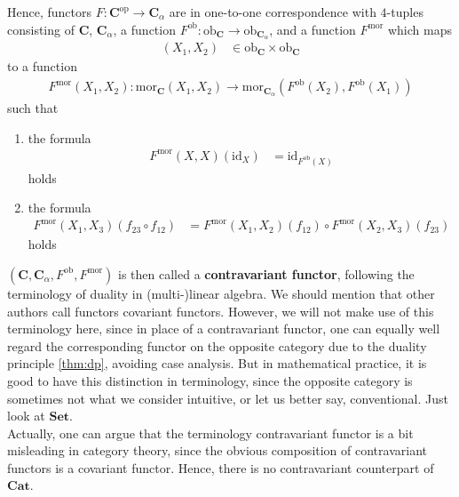 Hence, functors $F \colon \mathbf{C}^{\mathrm{op}} \rightarrow \mathbf{C}_{\alpha}$ are in one-to-one correspondence with $4$-tuples consisting of $\mathbf{C}$, $\mathbf{C}_{\alpha}$, a function $F^{\mathrm{ob}} \colon \mathrm{ob}_{\mathbf{C}} \rightarrow \mathrm{ob}_{\mathbf{C}_{\alpha}}$, and a function $F^{\mathrm{mor}}$ which maps
\begin{align*}
  (X_{1},X_{2})
  &\in
  \mathrm{ob}_{\mathbf{C}}
  \times
  \mathrm{ob}_{\mathbf{C}}
\end{align*}
to a function
\begin{align*}
  F^{\mathrm{mor}}(X_{1},X_{2})
  \colon
  \mathrm{mor}_{\mathbf{C}}(X_{1},X_{2})
  \rightarrow
  \mathrm{mor}_{\mathbf{C}_{\alpha}}
  (F^{\mathrm{ob}}(X_{2}),F^{\mathrm{ob}}(X_{1}))
\end{align*}
such that
\begin{enumerate}
\item[(F1$_{\mathbf{C}}^{\prime}$)]
the formula
\begin{align*}
  F^{\mathrm{mor}}(X,X)(\mathrm{id}_{X})
  &=
  \mathrm{id}_{F^{\mathrm{ob}}(X)}
\end{align*}
holds
\item[(F2$_{\mathbf{C}}^{\prime}$)]
the formula
\begin{align*}
  F^{\mathrm{mor}}(X_{1},X_{3})(f_{23} \circ f_{12})
  &=
  F^{\mathrm{mor}}(X_{1},X_{2})(f_{12})
  \circ
  F^{\mathrm{mor}}(X_{2},X_{3})(f_{23})
\end{align*}  
holds
\end{enumerate}
$(\mathbf{C},\mathbf{C}_{\alpha},F^{\mathrm{ob}},F^{\mathrm{mor}})$ is then called a \textbf{contravariant functor}, following the terminology of duality in (multi-)linear algebra.
We should mention that other authors call functors covariant functors.
However, we will not make use of this terminology here, since in place of a contravariant functor, one can equally well regard the corresponding functor on the opposite category due to the duality principle \ref{thm:dp}, avoiding case analysis.
But in mathematical practice, it is good to have this distinction in terminology, since the opposite category is sometimes not what we consider intuitive, or let us better say, conventional.
Just look at $\mathbf{Set}$.
\\
Actually, one can argue that the terminology {\glqq}contravariant functor{\grqq} is a bit misleading in category theory, since the obvious composition of contravariant functors is a covariant functor.
Hence, there is no contravariant counterpart of $\mathbf{Cat}$.
